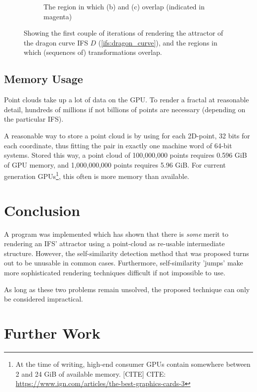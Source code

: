 \documentclass[11pt]{article}
\begin{document}
\begin{enumerate}
\begin{figure}
\begin{subfigure}[b]{0.4\textwidth}
         \caption{The region in which (b) and (c) overlap (indicated in magenta)}
         \label{figure:dragon_curve_d}
     \end{subfigure}
        \caption{Showing the first couple of iterations of rendering the attractor of the dragon curve IFS $D$ (\autoref{ifs:dragon_curve}), and the regions in which (sequences of) transformations overlap.}
        \label{figure:dragon_curve_overlaps}
\end{figure}

\end{enumerate}

\subsection{Memory Usage}
\label{sec:orga481eb4}

Point clouds take up a lot of data on the GPU. To render a fractal at reasonable detail, 
hundreds of millions if not billions of points are necessary (depending on the particular IFS).

A reasonable way to store a point cloud is by using for each 2D-point, 32 bits for each coordinate, thus fitting the pair in exactly one machine word of 64-bit systems.
Stored this way, a point cloud of 100,000,000 points requires 0.596 GiB of GPU memory,
and 1,000,000,000 points requires 5.96 GiB.
For current generation GPUs\footnote{At the time of writing, high-end consumer GPUs contain somewhere between 2 and 24 GiB of available memory. [CITE]
CITE: \url{https://www.ign.com/articles/the-best-graphics-cards-3}}, this often is more memory than available.

\section{Conclusion}
\label{sec:org382d045}
\label{section:conclusion}

A program was implemented which has shown that there is \emph{some} merit to rendering an IFS' attractor using a point-cloud as re-usable intermediate structure.
However, the self-similarity detection method that was proposed turns out to be unusable in common cases.
Furthermore, self-similarity 'jumps' make more sophisticated rendering techniques difficult if not impossible to use.

As long as these two problems remain unsolved, the proposed technique can only be considered impractical.

\section{Further Work}
\label{sec:org2f5b781}
\label{section:further_work}
\end{document}
